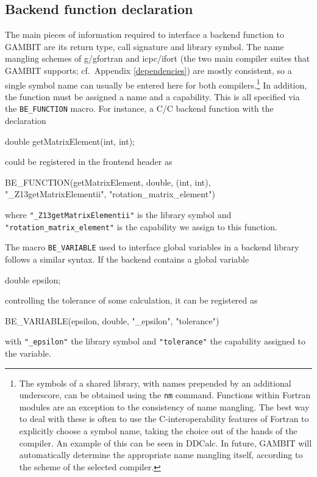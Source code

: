 \documentclass[pdftex,twocolumn,epjc3_preprint,runningheads]{svjour3}
\renewcommand{\_}{\discretionary{\underscore}{}{\underscore}}
\newcommand\term[1]{{\lstset{style=terminal}\lstinline!#1!\lstset{style=cpp}}}
\newcommand{\gambit}{\textsf{GAMBIT}\xspace}
\newcommand{\GB}{\gambit}
\newcommand\ddcalc{\textsf{DDCalc}\xspace}
\newcommand\xx{\raisebox{0.2ex}{\smaller ++}\xspace}
\newcommand\Cpp{\textsf{C\xx}\xspace}
\newcommand\plainC{\textsf{C}\xspace}
\newcommand\Fortran{\textsf{Fortran}\xspace}
\begin{document}
\subsection{Backend function declaration}
\label{declaration_be_func}

The main pieces of information required to interface a backend function to \GB are its return type, call signature and library symbol.  The name mangling schemes of \textsf{g\xx}/\textsf{gfortran} and \textsf{icpc}/\textsf{ifort} (the two main compiler suites that \GB supports; cf.\ Appendix \ref{dependencies}) are mostly consistent, so a single symbol name can usually be entered here for both compilers.\footnote{The symbols of a shared library, with names prepended by an additional underscore, can be obtained using the \term{nm} command.  Functions within \Fortran modules are an exception to the consistency of name mangling.  The best way to deal with these is often to use the \plainC-interoperability features of \Fortran to explicitly choose a symbol name, taking the choice out of the hands of the compiler.  An example of this can be seen in \ddcalc \cite{DarkBit}.  In future, \GB will automatically determine the appropriate name mangling itself, according to the scheme of the selected compiler.} In addition, the function must be assigned a name and a capability. This is all specified via the \lstinline|BE_FUNCTION| macro. For instance, a \plainC/\Cpp backend function with the declaration
\begin{lstcpp}
double getMatrixElement(int, int);
\end{lstcpp}
could be registered in the frontend header as
\begin{lstcpp}
BE_FUNCTION(getMatrixElement, double, (int, int),
 "_Z13getMatrixElementii",
 "rotation_matrix_element")
\end{lstcpp}
where \lstinline|"_Z13getMatrixElementii"| is the library symbol and \lstinline|"rotation_matrix_element"| is the capability we assign to this function.

The macro \lstinline|BE_VARIABLE| used to interface global variables in a backend library follows a similar syntax. If the backend contains a global variable
\begin{lstcpp}
double epsilon;
\end{lstcpp}
controlling the tolerance of some calculation, it can be registered as
\begin{lstcpp}
BE_VARIABLE(epsilon, double, "_epsilon",
 "tolerance")
\end{lstcpp}
with \lstinline|"_epsilon"| the library symbol and \lstinline|"tolerance"| the capability assigned to the variable.
\end{document}
